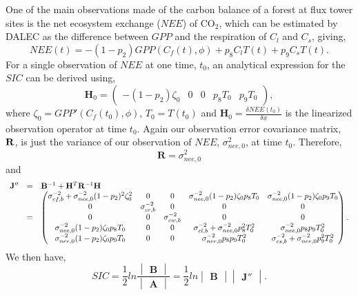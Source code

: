 \documentclass[11pt]{article}
\begin{document}
One of the main observations made of the carbon balance of a forest at flux tower sites is the net ecosystem exchange ($NEE$) of CO$_{2}$, which can be estimated by DALEC as the difference between $GPP$ and the respiration of $C_l$ and $C_s$, giving,
\[ 
NEE(t)=-(1-p_2)GPP(C_f(t),\phi)+p_8C_lT(t)+p_9C_sT(t). 
\]
For a single observation of $NEE$ at one time, $t_0$, an analytical expression for the $SIC$ can be derived using,
\[
\mathbf{H}_{0} = \begin{pmatrix}
-(1-p_{2})\zeta_0 & 0 & 0 & p_{8}T_{0} & p_{9}T_{0}
\end{pmatrix},
\]  
where $\zeta_0 = GPP'(C_f(t_0), \phi)$, $T_{0}=T(t_0)$ and $\mathbf{H}_{0}=\frac{\delta NEE(t_0)}{\delta\underline{x}}$ is the linearized observation operator at time $t_0$. Again our observation error covariance matrix, $\bf{R}$, is just the variance of our observation of $NEE$, $\sigma_{nee,0}^{2}$, at time $t_0$. Therefore,
\[
\mathbf{R}=\sigma_{nee,0}^{2}
\]  
and
\[
\begin{array} {lcl}
\mathbf{J}'' &=& \mathbf{B}^{-1}+\mathbf{H}^{T}\mathbf{R}^{-1}\bf{H} \\
&=& \begin{pmatrix} 
\sigma_{cf,b}^{-2}+\sigma_{nee,0}^{-2}(1-p_{2})^{2}\zeta_0^{2} & 0 & 0 & \sigma_{nee,0}^{-2}(1-p_{2})\zeta_0 p_{8}T_0 & \sigma_{nee,0}^{-2}(1-p_{2})\zeta_0 p_{9}T_0 \\
0 & \sigma_{cr,b}^{-2} & 0 & 0 & 0 \\
0 & 0 & \sigma_{cw,b}^{-2} & 0 & 0 \\
\sigma_{nee,0}^{-2}(1-p_{2})\zeta_0 p_{8}T_0 & 0 & 0 & \sigma_{cl,b}^{-2}+\sigma_{nee,0}^{-2}p_{8}^2 T_0^2 & \sigma_{nee,0}^{-2}p_{8}p_{9} T_0^2 \\
\sigma_{nee,0}^{-2}(1-p_{2})\zeta_0 p_{9}T_0 & 0 & 0 & \sigma_{nee,0}^{-2}p_{8}p_{9} T_0^2 & \sigma_{cs,b}^{-2}+\sigma_{nee,0}^{-2}p_{9}^2 T_0^2 \\
\end{pmatrix}.
\end{array}
\] 
We then have,
\[
SIC=\frac{1}{2}ln\frac{\begin{vmatrix} \mathbf{B} \end{vmatrix}}{\begin{vmatrix} \mathbf{A} \end{vmatrix}} = \frac{1}{2}ln\begin{vmatrix} \mathbf{B} \end{vmatrix}\begin{vmatrix} \mathbf{J}'' \end{vmatrix}.
\]
\end{document}
